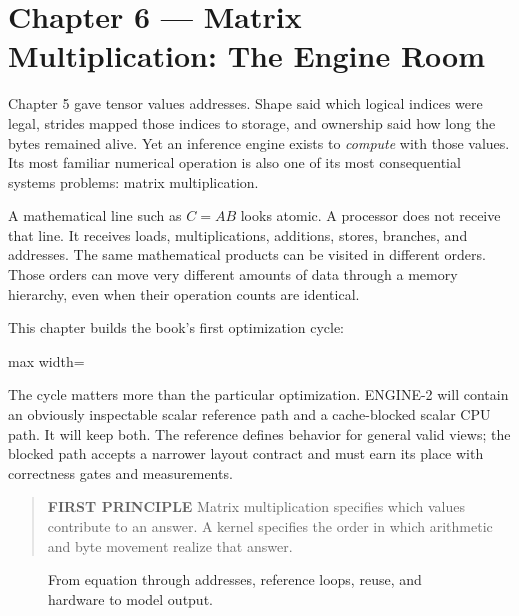 \documentclass[
  10pt,
]{article}
\begin{document}
\clearpage

\section{Chapter 6 --- Matrix Multiplication: The Engine
Room}\label{chapter-6-matrix-multiplication-the-engine-room}

Chapter 5 gave tensor values addresses. Shape said which logical indices
were legal, strides mapped those indices to storage, and ownership said
how long the bytes remained alive. Yet an inference engine exists to
\emph{compute} with those values. Its most familiar numerical operation
is also one of its most consequential systems problems: matrix
multiplication.

A mathematical line such as \(C=AB\) looks atomic. A processor does not
receive that line. It receives loads, multiplications, additions,
stores, branches, and addresses. The same mathematical products can be
visited in different orders. Those orders can move very different
amounts of data through a memory hierarchy, even when their operation
counts are identical.

This chapter builds the book's first optimization cycle:

\begin{center}\begin{adjustbox}{max width=\linewidth}\end{adjustbox}\end{center}

The cycle matters more than the particular optimization. ENGINE-2 will
contain an obviously inspectable scalar reference path and a
cache-blocked scalar CPU path. It will keep both. The reference defines
behavior for general valid views; the blocked path accepts a narrower
layout contract and must earn its place with correctness gates and
measurements.

\begin{quote}
\textbf{FIRST PRINCIPLE} Matrix multiplication specifies which values
contribute to an answer. A kernel specifies the order in which
arithmetic and byte movement realize that answer.
\end{quote}

\begin{figure}[H]\centering\resizebox{\linewidth}{!}{}\caption{From equation through addresses, reference loops, reuse, and hardware to model output.}\end{figure}
\end{document}
